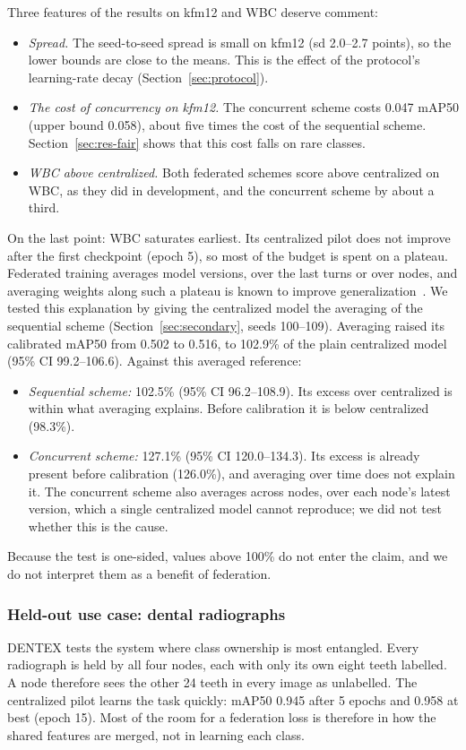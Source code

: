 \documentclass[pdflatex,sn-mathphys-num]{sn-jnl}
\begin{document}
Three features of the results on kfm12 and WBC deserve comment:
\begin{itemize}
\item \emph{Spread.} The seed-to-seed spread is small on kfm12 (sd 2.0--2.7 points), so the lower bounds are close to the means. This is the effect of the protocol's learning-rate decay (Section~\ref{sec:protocol}).
\item \emph{The cost of concurrency on kfm12.} The concurrent scheme costs 0.047 mAP50 (upper bound 0.058), about five times the cost of the sequential scheme. Section~\ref{sec:res-fair} shows that this cost falls on rare classes.
\item \emph{WBC above centralized.} Both federated schemes score above centralized on WBC, as they did in development, and the concurrent scheme by about a third.
\end{itemize}
On the last point: WBC saturates earliest. Its centralized pilot does not improve after the first checkpoint (epoch 5), so most of the budget is spent on a plateau. Federated training averages model versions, over the last turns or over nodes, and averaging weights along such a plateau is known to improve generalization~\cite{izmailov2018swa}. We tested this explanation by giving the centralized model the averaging of the sequential scheme (Section~\ref{sec:secondary}, seeds 100--109). Averaging raised its calibrated mAP50 from 0.502 to 0.516, to 102.9\% of the plain centralized model (95\% CI 99.2--106.6). Against this averaged reference:
\begin{itemize}
\item \emph{Sequential scheme:} 102.5\% (95\% CI 96.2--108.9). Its excess over centralized is within what averaging explains. Before calibration it is below centralized (98.3\%).
\item \emph{Concurrent scheme:} 127.1\% (95\% CI 120.0--134.3). Its excess is already present before calibration (126.0\%), and averaging over time does not explain it. The concurrent scheme also averages across nodes, over each node's latest version, which a single centralized model cannot reproduce; we did not test whether this is the cause.
\end{itemize}
Because the test is one-sided, values above 100\% do not enter the claim, and we do not interpret them as a benefit of federation.

\subsubsection{Held-out use case: dental radiographs}\label{sec:res-dentex}
DENTEX tests the system where class ownership is most entangled. Every radiograph is held by all four nodes, each with only its own eight teeth labelled. A node therefore sees the other 24 teeth in every image as unlabelled. The centralized pilot learns the task quickly: mAP50 0.945 after 5 epochs and 0.958 at best (epoch 15). Most of the room for a federation loss is therefore in how the shared features are merged, not in learning each class.
\end{document}
